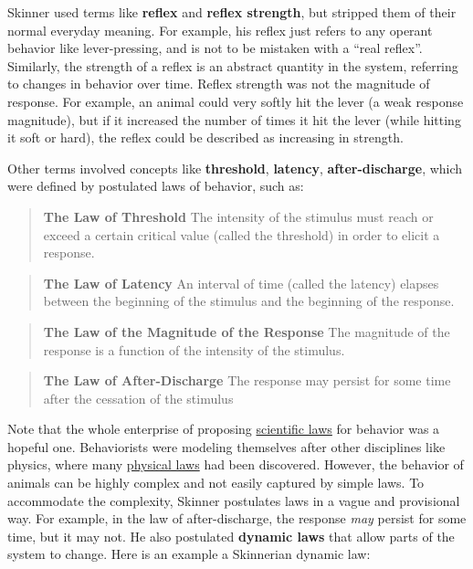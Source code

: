 \documentclass[
  oneside,
  12pt]{crumpbook}
\begin{document}
Skinner used terms like \textbf{reflex} and \textbf{reflex strength}, but stripped them of their normal everyday meaning. For example, his reflex just refers to any operant behavior like lever-pressing, and is not to be mistaken with a ``real reflex''. Similarly, the strength of a reflex is an abstract quantity in the system, referring to changes in behavior over time. Reflex strength was not the magnitude of response. For example, an animal could very softly hit the lever (a weak response magnitude), but if it increased the number of times it hit the lever (while hitting it soft or hard), the reflex could be described as increasing in strength.

Other terms involved concepts like \textbf{threshold}, \textbf{latency}, \textbf{after-discharge}, which were defined by postulated laws of behavior, such as:

\begin{quote}
\textbf{The Law of Threshold} The intensity of the stimulus must reach or exceed a certain critical value (called the threshold) in order to elicit a response.
\end{quote}

\begin{quote}
\textbf{The Law of Latency} An interval of time (called the latency) elapses between the beginning of the stimulus and the beginning of the response.
\end{quote}

\begin{quote}
\textbf{The Law of the Magnitude of the Response} The magnitude of the response is a function of the intensity of the stimulus.
\end{quote}

\begin{quote}
\textbf{The Law of After-Discharge} The response may persist for some time after the cessation of the stimulus
\end{quote}

Note that the whole enterprise of proposing \href{https://en.wikipedia.org/wiki/Scientific_law}{scientific laws} for behavior was a hopeful one. Behaviorists were modeling themselves after other disciplines like physics, where many \href{https://en.wikipedia.org/wiki/Scientific_law\#Laws_of_physics}{physical laws} had been discovered. However, the behavior of animals can be highly complex and not easily captured by simple laws. To accommodate the complexity, Skinner postulates laws in a vague and provisional way. For example, in the law of after-discharge, the response \emph{may} persist for some time, but it may not. He also postulated \textbf{dynamic laws} that allow parts of the system to change. Here is an example a Skinnerian dynamic law:
\end{document}
